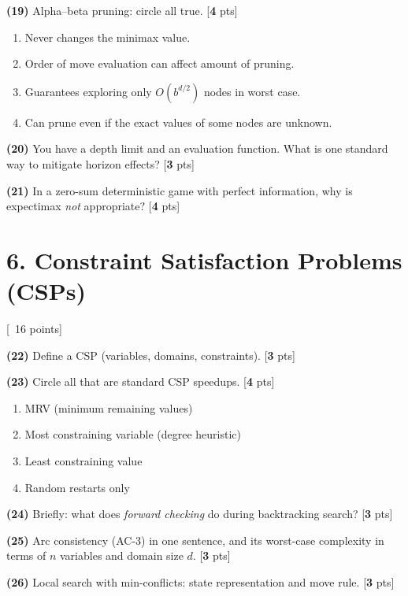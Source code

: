\documentclass[11pt]{article}
\newcommand{\pts}[1]{\hfill{\small[\textbf{#1} pts]}}
\begin{document}
\noindent\textbf{(19)} Alpha–beta pruning: circle all true. \pts{4}
\begin{enumerate}[label=(\alph*)]
\item Never changes the minimax value.
\item Order of move evaluation can affect amount of pruning.
\item Guarantees exploring only $O(b^{d/2})$ nodes in worst case.
\item Can prune even if the exact values of some nodes are unknown.
\end{enumerate}

\noindent\textbf{(20)} You have a depth limit and an evaluation function. What is one standard way to mitigate horizon effects? \pts{3}

\noindent\textbf{(21)} In a zero-sum deterministic game with perfect information, why is expectimax \emph{not} appropriate? \pts{4}

\vspace{0.6em}
\section*{6. Constraint Satisfaction Problems (CSPs)} \hfill {\small[~16 points]}

\noindent\textbf{(22)} Define a CSP (variables, domains, constraints). \pts{3}

\noindent\textbf{(23)} Circle all that are standard CSP speedups. \pts{4}
\begin{enumerate}[label=(\alph*)]
\item MRV (minimum remaining values)
\item Most constraining variable (degree heuristic)
\item Least constraining value
\item Random restarts only
\end{enumerate}

\noindent\textbf{(24)} Briefly: what does \emph{forward checking} do during backtracking search? \pts{3}

\noindent\textbf{(25)} Arc consistency (AC-3) in one sentence, and its worst-case complexity in terms of $n$ variables and domain size $d$. \pts{3}

\noindent\textbf{(26)} Local search with min-conflicts: state representation and move rule. \pts{3}

\vspace{0.6em}
\end{document}
